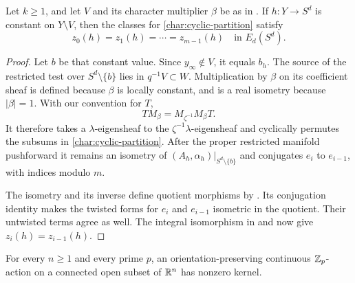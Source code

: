 \begin{proposition}\label{prop:equal-parts}
Let $k\geq1$, and let $V$ and its character multiplier $\beta$ be as
in . If $h:Y\to S^d$ is constant on
$Y\setminus V$, then the classes for
\eqref{char:cyclic-partition} satisfy
\[
 z_0(h)=z_1(h)=\cdots=z_{m-1}(h)\quad\text{in }E_d(S^d).
\]
\end{proposition}

\begin{proof}
Let $b$ be that constant value.  Since $y_\infty\notin V$, it equals
$b_h$.  The source of the restricted test over $S^d\setminus\{b\}$
lies in $q^{-1}V\subset W$.  Multiplication by $\beta$ on its
coefficient sheaf is defined because $\beta$ is locally constant, and
is a real isometry because $|\beta|=1$.  With our convention for $T$,
\[
 T M_\beta=M_{\zeta^{-1}}M_\beta T.
\]
It therefore takes a $\lambda$-eigensheaf to the
$\zeta^{-1}\lambda$-eigensheaf and cyclically permutes the subsums
in \eqref{char:cyclic-partition}.  After the proper restricted
manifold pushforward it remains an isometry of
$(A_h,\alpha_h)|_{S^d\setminus\{b\}}$ and conjugates $e_i$ to
$e_{i-1}$, with indices modulo $m$.

The isometry and its inverse define quotient morphisms by
.  Its conjugation identity makes the twisted forms
for $e_i$ and $e_{i-1}$ isometric in the quotient.  Their untwisted
terms agree as well.  The integral isomorphism in
 and
 now give $z_i(h)=z_{i-1}(h)$.
\end{proof}

\begin{theorem}\label{thm:contradiction}
For every $n\geq1$ and every prime $p$, an orientation-preserving
continuous $\mathbb Z_p$-action on a connected open subset of $\mathbb R^n$ has
nonzero kernel.
\end{theorem}

